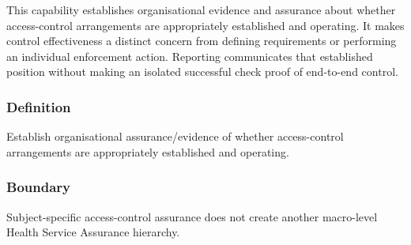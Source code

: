 This capability establishes organisational evidence and assurance about whether access-control arrangements are appropriately established and operating. It makes control effectiveness a distinct concern from defining requirements or performing an individual enforcement action. Reporting communicates that established position without making an isolated successful check proof of end-to-end control.

\subsubsection*{Definition}

Establish organisational assurance/\allowbreak{}evidence of whether access-control arrangements are appropriately established and operating.

\subsubsection*{Boundary}

Subject-specific access-control assurance does not create another macro-level Health Service Assurance hierarchy.

